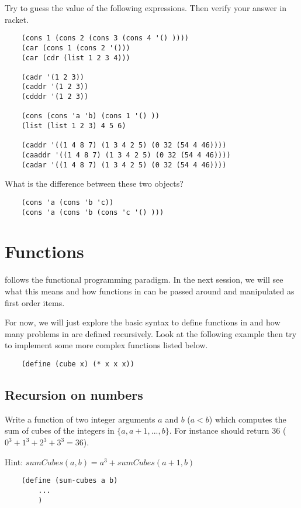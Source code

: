 \documentclass{../../../tp}
\begin{document}
\begin{instruction}
Try to guess the value of the following expressions. Then verify your answer in racket.

\begin{verbatim}
	(cons 1 (cons 2 (cons 3 (cons 4 '() ))))
	(car (cons 1 (cons 2 '()))
	(car (cdr (list 1 2 3 4)))
	
	(cadr '(1 2 3))
	(caddr '(1 2 3))
	(cdddr '(1 2 3))
	
	(cons (cons 'a 'b) (cons 1 '() ))
	(list (list 1 2 3) 4 5 6)
	
	(caddr '((1 4 8 7) (1 3 4 2 5) (0 32 (54 4 46))))
	(caaddr '((1 4 8 7) (1 3 4 2 5) (0 32 (54 4 46))))
	(cadar '((1 4 8 7) (1 3 4 2 5) (0 32 (54 4 46))))
\end{verbatim}
	
What is the difference between these two objects?
		
	\begin{verbatim}
	(cons 'a (cons 'b 'c))
	(cons 'a (cons 'b (cons 'c '() ))) 	
	\end{verbatim}
			
\end{instruction}



\section{Functions}

\scheme follows the functional programming paradigm. In the next session, we will see what this means and how functions in \scheme can be passed around and manipulated as first order items.

For now, we will just explore the basic syntax to define functions in \scheme and how many problems in \scheme are defined recursively. Look at the following example then try to implement some more complex functions listed below.

\begin{verbatim}
	(define (cube x) (* x x x))
\end{verbatim}




\subsection{Recursion on numbers}



\begin{instruction}
	Write a function  of two integer arguments $a$ and $b$ ($a < b$) which computes the sum of cubes of the integers in $\{a, a+1, ...,  b\}$. For instance  should return 36 ($0^3 + 1^3 + 2^3 + 3^3 = 36$).
	
	Hint: $sumCubes(a,b) = a^3 + sumCubes(a+1, b)$
	
	\begin{verbatim}
	(define (sum-cubes a b) 
		... 
		)
	\end{verbatim}
\end{instruction}
\end{document}
